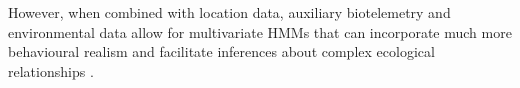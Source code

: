\documentclass[12pt]{article}\usepackage[]{graphicx}\usepackage[]{color}
\begin{document}
%
However, when combined with location data, auxiliary biotelemetry and environmental data allow for multivariate HMMs that can incorporate much more behavioural realism and facilitate inferences about complex ecological relationships  %
\citep[e.g.][]{McClintockEtAl2013c,McClintockEtAl2017,DeRuiterEtAl2017}.  
%
\end{document}
